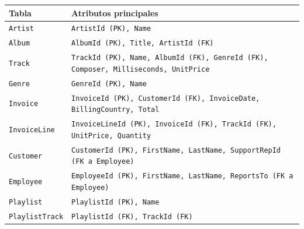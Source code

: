 \documentclass[11pt,a4paper]{article}
\begin{document}
\begin{center}\small
\begin{tabular}{ll}
\toprule
\textbf{Tabla} & \textbf{Atributos principales} \\
\midrule
\texttt{Artist}       & \texttt{ArtistId (PK), Name} \\
\texttt{Album}        & \texttt{AlbumId (PK), Title, ArtistId (FK)} \\
\texttt{Track}        & \texttt{TrackId (PK), Name, AlbumId (FK), GenreId (FK), Composer, Milliseconds, UnitPrice} \\
\texttt{Genre}        & \texttt{GenreId (PK), Name} \\
\texttt{Invoice}      & \texttt{InvoiceId (PK), CustomerId (FK), InvoiceDate, BillingCountry, Total} \\
\texttt{InvoiceLine}  & \texttt{InvoiceLineId (PK), InvoiceId (FK), TrackId (FK), UnitPrice, Quantity} \\
\texttt{Customer}     & \texttt{CustomerId (PK), FirstName, LastName, SupportRepId (FK a Employee)} \\
\texttt{Employee}     & \texttt{EmployeeId (PK), FirstName, LastName, ReportsTo (FK a Employee)} \\
\texttt{Playlist}     & \texttt{PlaylistId (PK), Name} \\
\texttt{PlaylistTrack}& \texttt{PlaylistId (FK), TrackId (FK)} \\
\bottomrule
\end{tabular}
\end{center}
\end{document}
